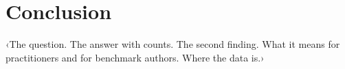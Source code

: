 \section{Conclusion}
\label{sec:conclusion}
‹The question. The answer with counts. The second finding. What it means for practitioners and for benchmark authors. Where the data is.›
